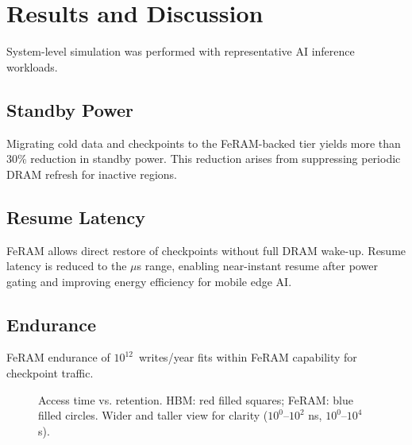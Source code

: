 \section{Results and Discussion}
System-level simulation was performed with representative AI inference workloads.

\subsection{Standby Power}
Migrating cold data and checkpoints to the FeRAM-backed tier yields more than 30\% reduction in standby power.
This reduction arises from suppressing periodic DRAM refresh for inactive regions.

\subsection{Resume Latency}
FeRAM allows direct restore of checkpoints without full DRAM wake-up.
Resume latency is reduced to the $\mu$s range, enabling near-instant resume after power gating and improving energy efficiency for mobile edge AI.

\subsection{Endurance}
FeRAM endurance of $10^{12}$~writes/year fits within FeRAM capability for checkpoint traffic.

\begin{figure}[!t]
\centering
{}
\caption{Access time vs. retention. HBM: red filled squares; FeRAM: blue filled circles. Wider and taller view for clarity ($10^0$--$10^2$ ns, $10^0$--$10^4$ s).}
\label{fig:retention}
\end{figure}
